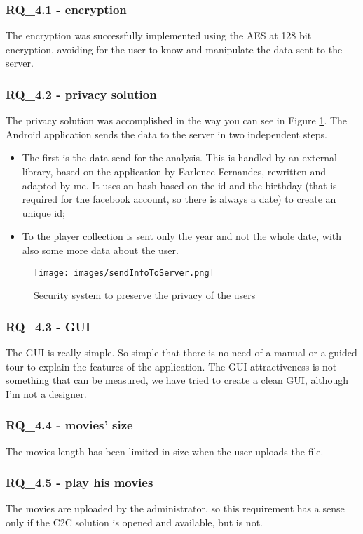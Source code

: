 \subsubsection{RQ\_4.1 - encryption}
The encryption was successfully implemented using the AES at 128 bit encryption, avoiding for the user to know and manipulate the data sent to the server.
\subsubsection{RQ\_4.2 - privacy solution}
The privacy solution was accomplished in the way you can see in Figure \ref{fig:securitySystem}. The Android application sends the data to the server in two independent steps.
		\begin{itemize}
			\item The first is the data send for the analysis. This is handled by an external library, based on the application by Earlence Fernandes, rewritten and adapted by me. It uses an hash based on the id and the birthday (that is required for the facebook account, so there is always a date) to create an unique id;
			\item To the player collection is sent only the year and not the whole date, with also some more data about the user.
		\end{itemize}

\begin{figure}[H]
\centering %
\texttt{[image: images/sendInfoToServer.png]}
\caption{Security system to preserve the privacy of the users}
\label{fig:securitySystem}
\end{figure}

\subsubsection{RQ\_4.3 - GUI}
The GUI is really simple. So simple that there is no need of a manual or a guided tour to explain the features of the application. The GUI attractiveness is not something that can be measured, we have tried to create a clean GUI, although I'm not a designer.
\subsubsection{RQ\_4.4 - movies' size}
The movies length has been limited in size when the user uploads the file.
\subsubsection{RQ\_4.5 - play his movies}
The movies are uploaded by the administrator, so this requirement has a sense only if the C2C solution is opened and available, but is not.
